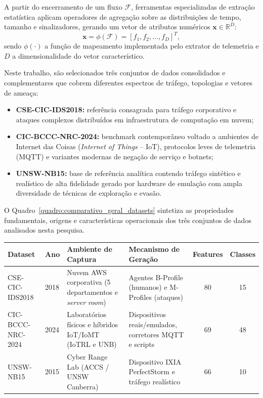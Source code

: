 A partir do encerramento de um fluxo $\mathcal{F}$, ferramentas especializadas de extração estatística aplicam operadores de agregação sobre as distribuições de tempo, tamanho e sinalizadores, gerando um vetor de atributos numéricos $\mathbf{x} \in \mathbb{R}^D$:
\begin{equation}
\label{eq:vetor_caracteristicas}
\mathbf{x} = \phi(\mathcal{F}) = [f_1, f_2, \dots, f_D]^T,
\end{equation}
sendo $\phi(\cdot)$ a função de mapeamento implementada pelo extrator de telemetria e $D$ a dimensionalidade do vetor característico.

Neste trabalho, são selecionados três conjuntos de dados consolidados e complementares que cobrem diferentes espectros de tráfego, topologias e vetores de ameaça:
\begin{itemize}
    \item \textbf{CSE-CIC-IDS2018:} referência consagrada para tráfego corporativo e ataques complexos distribuídos em infraestrutura de computação em nuvem;
    \item \textbf{CIC-BCCC-NRC-2024:} benchmark contemporâneo voltado a ambientes de Internet das Coisas (\emph{Internet of Things} -- IoT), protocolos leves de telemetria (MQTT) e variantes modernas de negação de serviço e botnets;
    \item \textbf{UNSW-NB15:} base de referência analítica contendo tráfego sintético e realístico de alta fidelidade gerado por hardware de emulação com ampla diversidade de técnicas de exploração e evasão.
\end{itemize}

O Quadro~\ref{quadro:comparativo_geral_datasets} sintetiza as propriedades fundamentais, origens e características operacionais dos três conjuntos de dados analisados nesta pesquisa.

\begin{quadro}[htb]
\centering
\caption{Quadro comparativo dos datasets selecionados para treinamento e avaliação.}
\label{quadro:comparativo_geral_datasets}
\small
\begin{tabularx}{\textwidth}{|l|l|X|X|c|c|}
\hline
\textbf{Dataset} & \textbf{Ano} & \textbf{Ambiente de Captura} & \textbf{Mecanismo de Geração} & \textbf{Features} & \textbf{Classes} \\ \hline
CSE-CIC-IDS2018 & 2018 & Nuvem AWS corporativa (5 departamentos e \emph{server room}) & Agentes B-Profile (humanos) e M-Profiles (ataques) & 80 & 15 \\ \hline
CIC-BCCC-NRC-2024 & 2024 & Laboratórios físicos e híbridos IoT/IoMT (IoTRL e UNB) & Dispositivos reais/emulados, corretores MQTT e scripts & 69 & 48 \\ \hline
UNSW-NB15 & 2015 & Cyber Range Lab (ACCS / UNSW Canberra) & Dispositivo IXIA PerfectStorm e tráfego realístico & 66 & 10 \\ \hline
\end{tabularx}
\end{quadro}


